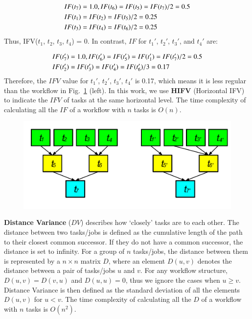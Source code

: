 \begin{eqnarray}
	\displaystyle  
	&IF(t_7 )=1.0, IF(t_6 )=IF(t_5 )=IF(t_7 )/2=0.5\nonumber  \\
	&IF(t_1 )=IF(t_2 )=IF(t_5 )/2=0.25\nonumber \\
	&IF(t_3 )=IF(t_4 )=IF(t_6 )/2=0.25\nonumber 
\end{eqnarray}
Thus, IFV($t_1$, $t_2$, $t_3$, $t_4$) = 0. In contrast, $IF$ for $t_1'$, $t_2'$, $t_3'$, and $t_4'$ are:

\begin{eqnarray}
	\displaystyle  
	&IF(t_7')=1.0, IF(t_6')=IF(t_5')=IF(t_1')=IF(t_7')/2=0.5\nonumber \\
	&IF(t_2')=IF(t_3')=IF(t_4')=IF(t_6')/3=0.17 \nonumber
\end{eqnarray}
Therefore, the $IFV$ value for {$t_1'$, $t_2'$, $t_3'$, $t_4'$} is 0.17, which means it is less regular than the workflow in Fig.~\ref{fig:imbalance_hifv} (left). In this work, we use \textbf{HIFV} (Horizontal IFV) to indicate the $IFV$ of tasks at the same horizontal level. The time complexity of calculating all the $IF$ of a workflow with $n$ tasks is $O(n)$.  



\begin{figure}[htb]
	\centering
	\includegraphics[width=0.85\linewidth]{figures/imbalance/dependency.pdf}
	\label{fig:imbalance_hifv}
\end{figure}

\textbf{Distance Variance} ($DV$) describes how `closely' tasks are to each other. The distance between two tasks/jobs is defined as the cumulative length of the path to their closest common successor. If they do not have a common successor, the distance is set to infinity. For a group of $n$ tasks/jobs, the distance between them is represented by a $n \times n$ matrix $D$, where an element $D(u,v)$ denotes the distance between a pair of tasks/jobs $u$ and $v$. For any workflow structure, $D(u,v)=D(v,u)$ and $D(u,u)=0$, thus we ignore the cases when $u \geq v$. Distance Variance is then defined as the standard deviation of all the elements $D(u,v)$ for $u<v$. The time complexity of calculating all the $D$ of a workflow with $n$ tasks is $O(n^2)$. 

